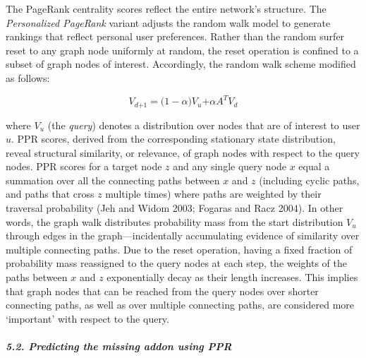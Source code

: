 \documentclass{article} %
\begin{document}
The PageRank centrality scores reflect the entire network's structure. The\textit{ Personalized PageRank} variant adjusts the random walk model to generate rankings that reflect personal user preferences. Rather than the random surfer reset to any graph node uniformly at random, the reset operation is confined to a subset of graph nodes of interest. Accordingly, the random walk scheme modified as follows: 


\begin{equation} \label{GrindEQ__3_} 
V_{d\mathrm{+1}}\mathrm{=(1-}\alpha \mathrm{)}V_u\mathrm{+}\alpha A^TV_d 
\end{equation} 


\noindent where $V_u$ (the \textit{query}) denotes a distribution over nodes that are of interest to user $u$. PPR scores, derived from the corresponding stationary state distribution, reveal structural similarity, or relevance, of graph nodes with respect to the query nodes. PPR scores for a target node $z$ and any single query node $x$ equal a summation over all the connecting paths between $x$ and $z$ (including cyclic paths, and paths that cross $z$ multiple times) where paths are weighted by their traversal probability (Jeh and Widom 2003; Fogaras and Racz 2004). In other words, the graph walk distributes probability mass from the start distribution $V_u$ through edges in the graph---incidentally accumulating evidence of similarity over multiple connecting paths. Due to the reset operation, having a fixed fraction of probability mass reassigned to the query nodes at each step, the weights of the paths between $x$ and $z$ exponentially decay as their length increases. This implies that graph nodes that can be reached from the query nodes over shorter connecting paths, as well as over multiple connecting paths, are considered more `important' with respect to the query.




\subparagraph{5.2.  Predicting the missing addon using PPR}
\end{document}
